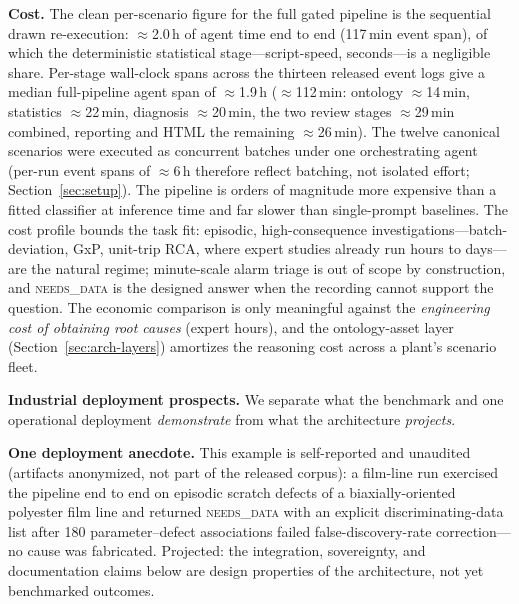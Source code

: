 \documentclass[preprint,12pt]{elsarticle}
\begin{document}
\textbf{Cost.} The clean per-scenario figure for the full gated pipeline is the sequential drawn re-execution: $\approx$2.0\,h of agent time end to end (117\,min event span), of which the deterministic statistical stage---script-speed, seconds---is a negligible share. Per-stage wall-clock spans across the thirteen released event logs give a median full-pipeline agent span of $\approx$1.9\,h ($\approx$112\,min: ontology $\approx$14\,min, statistics $\approx$22\,min, diagnosis $\approx$20\,min, the two review stages $\approx$29\,min combined, reporting and HTML the remaining $\approx$26\,min). The twelve canonical scenarios were executed as concurrent batches under one orchestrating agent (per-run event spans of $\approx$6\,h therefore reflect batching, not isolated effort; Section~\ref{sec:setup}). The pipeline is orders of magnitude more expensive than a fitted classifier at inference time and far slower than single-prompt baselines. The cost profile bounds the task fit: episodic, high-consequence investigations---batch-deviation, GxP, unit-trip RCA, where expert studies already run hours to days---are the natural regime; minute-scale alarm triage is out of scope by construction, and \textsc{needs\_data} is the designed answer when the recording cannot support the question. The economic comparison is only meaningful against the \emph{engineering cost of obtaining root causes} (expert hours), and the ontology-asset layer (Section~\ref{sec:arch-layers}) amortizes the reasoning cost across a plant's scenario fleet.

\textbf{Industrial deployment prospects.}
We separate what the benchmark and one operational deployment \emph{demonstrate} from what the architecture \emph{projects}.

\textbf{One deployment anecdote.} This example is self-reported and unaudited (artifacts anonymized, not part of the released corpus): a film-line run exercised the pipeline end to end on episodic scratch defects of a biaxially-oriented polyester film line and returned \mbox{\textsc{needs\_data}} with an explicit discriminating-data list after 180 parameter--defect associations failed false-discovery-rate correction---no cause was fabricated. Projected: the integration, sovereignty, and documentation claims below are design properties of the architecture, not yet benchmarked outcomes.
\end{document}
